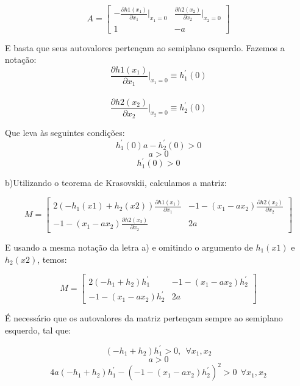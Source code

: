 \[
A = \begin{bmatrix}
 -\frac{\partial h1(x_1)}{\partial x_1} \bigg |_{x_1 = 0} & \frac{\partial h2(x_2)}{\partial x_2} \bigg |_{x_2 = 0}\\
 1 & -a
\end{bmatrix}
\]

E basta que seus autovalores pertençam ao semiplano esquerdo. Fazemos a notação:
\[
 \frac{\partial h1(x_1)}{\partial x_1} \bigg |_{x_1 = 0} \equiv h_1^{'}(0)
 \] \\ 
 \[\frac{\partial h2(x_2)}{\partial x_2} \bigg |_{x_2 = 0} \equiv h_2^{'}(0)
\]


Que leva às seguintes condições:
\begin{equation}
h_1^{'}(0)a - h_2^{'}(0) >0
\end{equation}
\begin{equation}
a>0
\end{equation}
\begin{equation}
h_1^{'}(0)>0
\end{equation}

b)Utilizando o teorema de Krasovskii, calculamos a matriz:

\[
M = \begin{bmatrix}
 2(-h_1(x1) + h_2(x2))\frac{\partial h1(x_1)}{\partial x_1} & -1 -(x_1-ax_2)\frac{\partial h2(x_2)}{\partial x_2}\\
-1 -(x_1-ax_2)\frac{\partial h2(x_2)}{\partial x_2} & 2a
\end{bmatrix}
\]

E usando a mesma notação da letra a) e omitindo o argumento de $h_1(x1)$ e $h_2(x2)$, temos:

\[
M = \begin{bmatrix}
 2(-h_1 + h_2)h_1^{'} & -1 -(x_1-ax_2)h_2^{'}\\
-1 -(x_1-ax_2)h_2^{'} & 2a
\end{bmatrix}
\]

É necessário que os autovalores da matriz pertençam sempre ao semiplano esquerdo, tal que:

\begin{equation}
(-h_1 + h_2)h_1^{'}>0,~~\forall x_1,x_2
\end{equation}
\begin{equation}
a>0
\end{equation}
\begin{equation}
4a(-h_1 + h_2)h_1^{'} - (-1 -(x_1-ax_2)h_2^{'})^2 >0~~\forall x_1,x_2
\end{equation}

